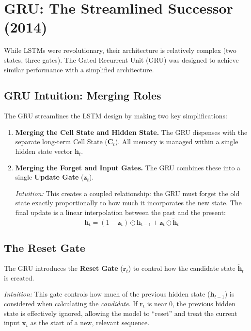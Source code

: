 \documentclass{article}
\begin{document}
\section{GRU: The Streamlined Successor (2014)}

While LSTMs were revolutionary, their architecture is relatively complex (two states, three gates). The Gated Recurrent Unit (GRU) was designed to achieve similar performance with a simplified architecture.

\subsection{GRU Intuition: Merging Roles}

The GRU streamlines the LSTM design by making two key simplifications:

\begin{enumerate}
    \item \textbf{Merging the Cell State and Hidden State.} The GRU dispenses with the separate long-term Cell State ($\mathbf{C}_t$). All memory is managed within a single hidden state vector $\mathbf{h}_t$.
    
    \item \textbf{Merging the Forget and Input Gates.} The GRU combines these into a single \textbf{Update Gate} ($\mathbf{z}_t$).
    
    \textit{Intuition:} This creates a coupled relationship: the GRU must forget the old state exactly proportionally to how much it incorporates the new state. The final update is a linear interpolation between the past and the present:
    $$ \mathbf{h}_t = (1-\mathbf{z}_t) \odot \mathbf{h}_{t-1} + \mathbf{z}_t \odot \tilde{\mathbf{h}}_t $$
\end{enumerate}

\subsection{The Reset Gate}

The GRU introduces the \textbf{Reset Gate} ($\mathbf{r}_t$) to control how the candidate state $\tilde{\mathbf{h}}_t$ is created.

\textit{Intuition:} This gate controls how much of the previous hidden state ($\mathbf{h}_{t-1}$) is considered when calculating the \emph{candidate}. If $\mathbf{r}_t$ is near 0, the previous hidden state is effectively ignored, allowing the model to ``reset'' and treat the current input $\mathbf{x}_t$ as the start of a new, relevant sequence.
\end{document}

